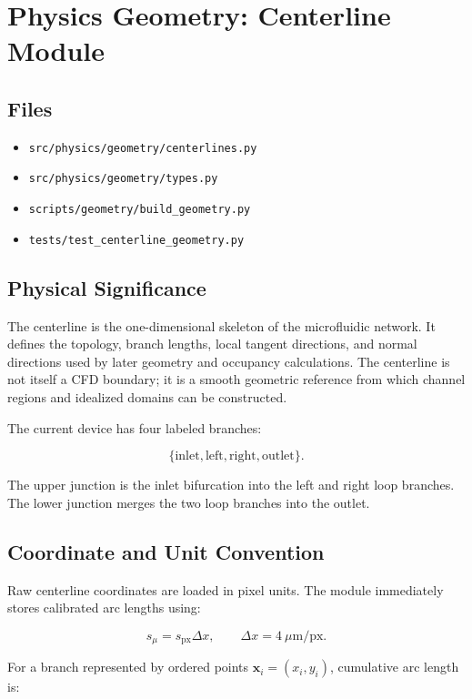 \section{Physics Geometry: Centerline Module}

\subsection{Files}

\begin{itemize}
  \item \texttt{src/physics/geometry/centerlines.py}
  \item \texttt{src/physics/geometry/types.py}
  \item \texttt{scripts/geometry/build\_geometry.py}
  \item \texttt{tests/test\_centerline\_geometry.py}
\end{itemize}

\subsection{Physical Significance}

The centerline is the one-dimensional skeleton of the microfluidic network.
It defines the topology, branch lengths, local tangent directions, and normal
directions used by later geometry and occupancy calculations. The centerline is
not itself a CFD boundary; it is a smooth geometric reference from which channel
regions and idealized domains can be constructed.

The current device has four labeled branches:

\[
\{\mathrm{inlet}, \mathrm{left}, \mathrm{right}, \mathrm{outlet}\}.
\]

The upper junction is the inlet bifurcation into the left and right loop
branches. The lower junction merges the two loop branches into the outlet.

\subsection{Coordinate and Unit Convention}

Raw centerline coordinates are loaded in pixel units. The module immediately
stores calibrated arc lengths using:

\[
s_\mu = s_{\mathrm{px}}\Delta x,
\qquad
\Delta x = 4~\mu\mathrm{m}/\mathrm{px}.
\]

For a branch represented by ordered points \(\mathbf{x}_i=(x_i,y_i)\), cumulative
arc length is:

